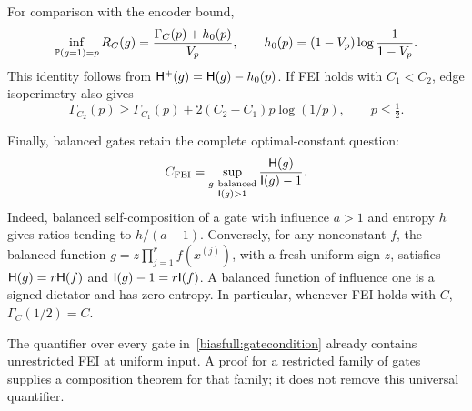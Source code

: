 For comparison with the encoder bound,
\begin{equation}\label{biasfull:encoderpotential}
 \inf_{\P(g=1)=p}R_C(g)
   =\frac{\Gamma_C(p)+h_0(p)}{V_p},
 \qquad
 h_0(p)=(1-V_p)\log\frac1{1-V_p}.
\end{equation}
This identity follows from \(\HH^+(g)=\HH(g)-h_0(p)\).
If FEI holds with \(C_1<C_2\), edge isoperimetry also gives
\[
 \Gamma_{C_2}(p)\ge\Gamma_{C_1}(p)
                 +2(C_2-C_1)p\log(1/p),\qquad p\le\tfrac12.
\]

Finally, balanced gates retain the complete optimal-constant question:
\begin{equation}\label{biasfull:balancedoptimal}
 C_{\rm FEI}
  =\sup_{\substack{g\ {\rm balanced}\\\I(g)>1}}
                       \frac{\HH(g)}{\I(g)-1}.
\end{equation}
Indeed, balanced self-composition of a gate with influence \(a>1\)
and entropy \(h\) gives ratios tending to \(h/(a-1)\).
Conversely, for any nonconstant \(f\), the balanced function
\(g=z\prod_{j=1}^r f(x^{(j)})\), with a fresh uniform sign \(z\),
satisfies \(\HH(g)=r\HH(f)\) and
\(\I(g)-1=r\I(f)\). A balanced function of influence one is a
signed dictator and has zero entropy.
In particular, whenever FEI holds with \(C\),
\(\Gamma_C(1/2)=C\).

The quantifier over every gate in~\eqref{biasfull:gatecondition}
already contains unrestricted FEI at uniform input. A proof for a
restricted family of gates supplies a composition theorem for that
family; it does not remove this universal quantifier.
